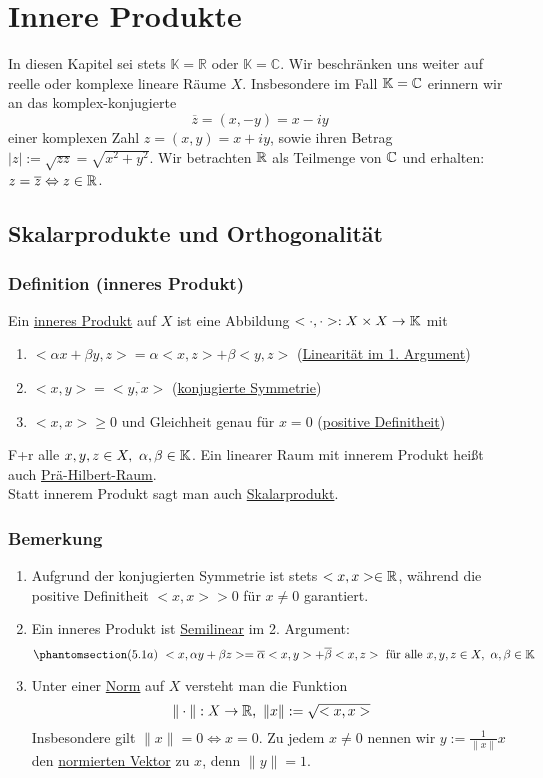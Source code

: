 \section{Innere Produkte}
In diesen Kapitel sei stets $\mathbb{K}=\mathbb{R}$ oder $\mathbb{K}=\mathbb{C}$.  Wir beschränken uns weiter auf reelle oder komplexe lineare Räume $X$.  Insbesondere im Fall $\mathbb{K} = \mathbb{C}$ erinnern wir an das komplex-konjugierte
\[\overline{z}=(x,-y)=x-iy\]
einer komplexen Zahl $z=(x,y)=x+iy$, sowie ihren Betrag $\left|z\right|:=\sqrt{zz}=\sqrt{x^2+y^2}$.  Wir betrachten $\mathbb{R}$ als Teilmenge von $\mathbb{C}$ und erhalten: $z=\overline{z}\Leftrightarrow z\in \mathbb{R}$.
\subsection{Skalarprodukte und Orthogonalität}
\subsubsection{Definition (inneres Produkt)}
Ein \underline{inneres Produkt} auf $X$ ist eine Abbildung $<\cdot ,\cdot >: X\times X\rightarrow \mathbb{K}$ mit
\romannum
\begin{enumerate}
\item $<\alpha x+\beta y,z>=\alpha <x,z>+\beta <y,z>$ (\underline{Linearität im 1. Argument})
\item $<x,y>=\overline{<y,x>}$ (\underline{konjugierte Symmetrie})
\item $<x,x>\geq 0$ und Gleichheit genau für $x=0$ (\underline{positive Definitheit})
\end{enumerate}
F+r alle $x,y,z\in X,\ \alpha,\beta \in \mathbb{K}$.  Ein linearer Raum mit innerem Produkt heißt auch \underline{Prä-Hilbert-Raum}.\\
Statt innerem Produkt sagt man auch \underline{Skalarprodukt}.
\subsubsection{Bemerkung}
\numbers
\begin{enumerate}
\item Aufgrund der konjugierten Symmetrie ist stets $<x,x>\in \mathbb{R}$, während die positive Definitheit $<x,x>>0$ für $x\not=0$ garantiert.
\item Ein inneres Produkt ist \underline{Semilinear} im 2. Argument:
\[\phantomsection\label{5.1a}(5.1a)\ <x,\alpha y+\beta z>=\overline{\alpha }<x,y>+\overline{\beta }<x,z>\text{ für alle } x,y,z \in X,\ \alpha, \beta \in \K\]
\item Unter einer \underline{Norm} auf $X$ versteht man die Funktion
\[\|\cdot \| : X\rightarrow \mathbb{R},\ \|x\| :=\sqrt{<x,x>}\]
Insbesondere gilt $\|x\|=0\Leftrightarrow x=0$.  Zu jedem $x\not=0$ nennen wir $y:=\frac{1}{\|x\|}x$ den \underline{normierten Vektor} zu $x$, denn $\|y\|=1$.
\end{enumerate}
